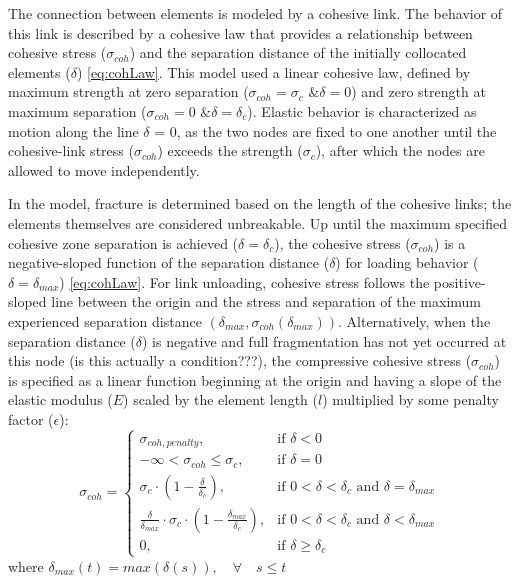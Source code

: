 \documentclass[12pt,a4paper]{article}
\begin{document}
The connection between elements is modeled by a cohesive link. The behavior of this link is described by a cohesive law that provides a relationship between cohesive stress ($\sigma_{coh}$) and the separation distance of the initially collocated elements ($\delta$) \eqref{eq:cohLaw}. This model used a linear cohesive law, defined by maximum strength at zero separation ($\sigma_{coh} = \sigma_{c} \mbox{ \& } \delta = 0$) and zero strength at maximum separation ($\sigma_{coh} = 0 \mbox{ \& } \delta = \delta_{c}$). Elastic behavior is characterized as motion along the line $\delta$ = 0, as the two nodes are fixed to one another until the cohesive-link stress ($\sigma_{coh}$) exceeds the strength ($\sigma_{c}$), after which the nodes are allowed to move independently.

In the model, fracture is determined based on the length of the cohesive links; the elements themselves are considered unbreakable. Up until the maximum specified cohesive zone separation is achieved ($\delta = \delta_{c}$), the cohesive stress ($\sigma_{coh}$) is a negative-sloped function of the separation distance ($\delta$) for loading behavior ($\delta = \delta_{max}$) \eqref{eq:cohLaw}.  For link unloading, cohesive stress follows the positive-sloped line between the origin and the stress and separation of the maximum experienced separation distance $(\delta_{max}, \sigma_{coh}(\delta_{max}))$. Alternatively, when the separation distance ($\delta$) is negative and full fragmentation has not yet occurred at this node (is this actually a condition???), the compressive cohesive stress ($\sigma_{coh}$) is specified as a linear function beginning at the origin and having a slope of the elastic modulus ($E$) scaled by the element length ($l$) multiplied by some penalty factor ($\epsilon$):
\begin{equation}
\sigma_{coh} = \begin{cases} \sigma_{coh,penalty}, & \mbox{if } \delta < 0 \\ -\infty < \sigma_{coh} \leq \sigma_{c}, & \mbox{if } \delta = 0 \\ \sigma_{c} \cdot  (1-\frac{\delta}{\delta_{c}}), & \mbox{if } 0 < \delta < \delta_{c} \mbox{ and } \delta = \delta_{max} \\ \frac{\delta}{\delta_{max}} \cdot \sigma_{c} \cdot (1-\frac{\delta_{max}}{\delta_{c}}), & \mbox{if } 0 < \delta < \delta_{c} \mbox{ and } \delta < \delta_{max}  \\ 0, & \mbox{if } \delta \geq \delta_{c} \end{cases}
\label{eq:cohLaw}
\end{equation}
where
$\delta_{max}(t) = max(\delta(s)), \quad \forall \quad s \leq t$
\end{document}

